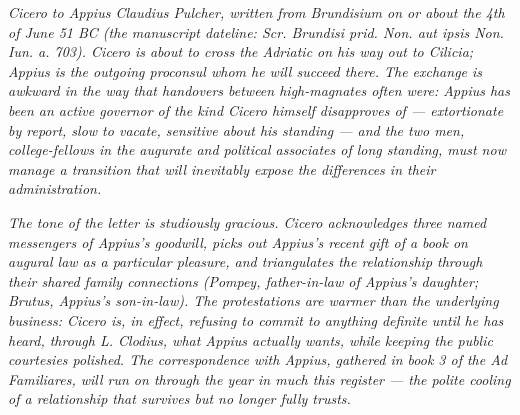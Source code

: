 
\textit{Cicero to Appius Claudius Pulcher, written from
Brundisium on or about the 4th of June 51 BC (the
manuscript dateline: \textit{Scr. Brundisi prid. Non.
aut ipsis Non. Iun. a. 703}). Cicero is about to cross
the Adriatic on his way out to Cilicia; Appius is the
outgoing proconsul whom he will succeed there. The
exchange is awkward in the way that handovers between
high-magnates often were: Appius has been an active
governor of the kind Cicero himself disapproves of ---
extortionate by report, slow to vacate, sensitive about
his standing --- and the two men, college-fellows in
the augurate and political associates of long standing,
must now manage a transition that will inevitably
expose the differences in their administration.}

\textit{The tone of the letter is studiously gracious.
Cicero acknowledges three named messengers of Appius's
goodwill, picks out Appius's recent gift of a book on
augural law as a particular pleasure, and triangulates
the relationship through their shared family
connections (Pompey, father-in-law of Appius's daughter;
Brutus, Appius's son-in-law). The protestations are
warmer than the underlying business: Cicero is, in
effect, refusing to commit to anything definite until he
has heard, through L. Clodius, what Appius actually
wants, while keeping the public courtesies polished. The
correspondence with Appius, gathered in book 3 of the
\textit{Ad Familiares}, will run on through the year in
much this register --- the polite cooling of a
relationship that survives but no longer fully trusts.}
